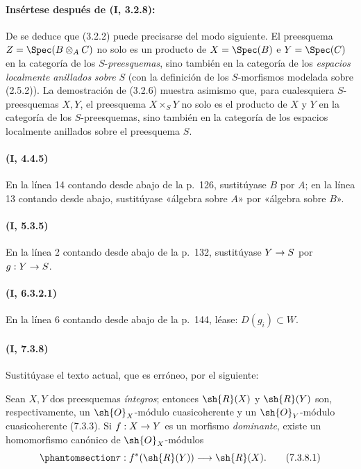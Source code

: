 \documentclass[oneside,10pt]{amsart}
\makeatletter
\newcommand{\ega@arrow}[2]{\mathchoice{#1}{#2}{#2}{#2}}
\renewcommand{\to}{\ega@arrow{\longrightarrow}{\rightarrow}}
\newcommand{\oldpage}[2][]{\marginnote{\normalfont\footnotesize\textbf{#1}~|~#2}\ignorespaces}
\let\EGAOriginalLabel\label
\renewcommand{\label}[1]{\phantomsection\EGAOriginalLabel{#1}}
\makeatother
\begin{document}
\paragraph{Insértese después de (I, 3.2.8):}

\begin{env}[3.2.9]
\label{ega2:addendum:I.3.2.9-fr}
De  se deduce que (3.2.2) puede precisarse del modo
siguiente. El preesquema
$Z=\Spec(B\otimes_A C)$
no solo es un producto de $X=\Spec(B)$ e $Y=\Spec(C)$ en la categoría
de los $S$-\emph{preesquemas}, sino también en la categoría de los \emph{espacios
localmente anillados} \emph{sobre} $S$ (con la definición de los
$S$-morfismos modelada sobre (2.5.2)). La demostración de (3.2.6)
muestra asimismo que, para cualesquiera $S$-preesquemas $X,Y$, el
preesquema $X\times_S Y$ no solo es el producto de $X$ y $Y$ en la categoría de los
$S$-preesquemas, sino también en la categoría de los espacios
localmente anillados sobre el preesquema $S$.
\end{env}

\paragraph{(I, 4.4.5)}
En la línea 14 contando desde abajo de la p.~126, sustitúyase $B$ por
$A$; en la línea 13 contando desde abajo, sustitúyase «álgebra sobre
$A$» por «álgebra sobre $B$».

\paragraph{(I, 5.3.5)}
En la línea 2 contando desde abajo de la p.~132, sustitúyase $Y\to S$
por $g:Y\to S$.

\paragraph{(I, 6.3.2.1)}
En la línea 6 contando desde abajo de la p.~144, léase:
$D(g_i)\subset W$.

\paragraph{(I, 7.3.8)}
Sustitúyase el texto actual, que es erróneo, por el siguiente:

Sean $X,Y$ dos preesquemas \emph{íntegros}; entonces $\sh{R}(X)$ y
$\sh{R}(Y)$ son, respectivamente, un $\sh{O}_X$-módulo
cuasicoherente y un $\sh{O}_Y$-módulo cuasicoherente (7.3.3). Si
$f:X\to Y$ es un morfismo \emph{dominante}, existe un homomorfismo canónico
de $\sh{O}_X$-módulos
\oldpage[II]{222}
\begin{equation}
\label{ega2:addendum:I.7.3.8.1-fr}
  \tau:f^*(\sh{R}(Y))\to\sh{R}(X).
\tag{7.3.8.1}
\end{equation}
\end{document}
